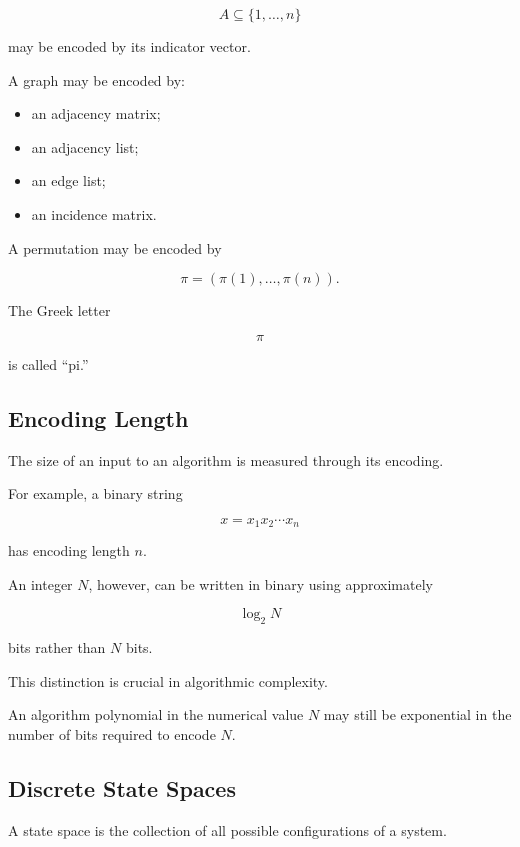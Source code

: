\[
A\subseteq\{1,\ldots,n\}
\]

may be encoded by its indicator vector.

A graph may be encoded by:

\begin{itemize}
    \item an adjacency matrix;
    \item an adjacency list;
    \item an edge list;
    \item an incidence matrix.
\end{itemize}

A permutation may be encoded by

\[
\pi=(\pi(1),\ldots,\pi(n)).
\]

The Greek letter

\[
\pi
\]

is called ``pi.''

\subsection{Encoding Length}
\label{subsec:encoding-length}

The size of an input to an algorithm is measured through its encoding.

For example, a binary string

\[
x=x_1x_2\cdots x_n
\]

has encoding length \(n\).

An integer \(N\), however, can be written in binary using approximately

\[
\log_2 N
\]

bits rather than \(N\) bits.

This distinction is crucial in algorithmic complexity.

An algorithm polynomial in the numerical value \(N\) may still be
exponential in the number of bits required to encode \(N\).

\subsection{Discrete State Spaces}
\label{subsec:discrete-state-spaces}

A state space is the collection of all possible configurations of a
system.

